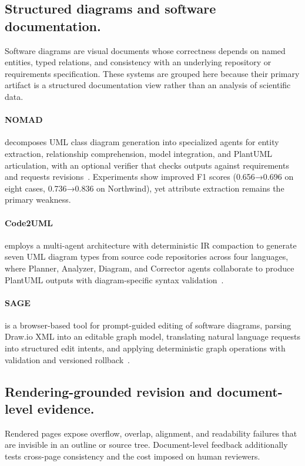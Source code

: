 \subsection{Structured diagrams and software documentation.}
Software diagrams are visual documents whose correctness depends on named entities, typed relations, and consistency with an underlying repository or requirements specification. These systems are grouped here because their primary artifact is a structured documentation view rather than an analysis of scientific data.

\paragraph{NOMAD}
 decomposes UML class diagram generation into specialized agents for entity extraction, relationship comprehension, model integration, and PlantUML articulation, with an optional verifier that checks outputs against requirements and requests revisions~\cite{avg251122409}. Experiments show improved F1 scores (0.656→0.696 on eight cases, 0.736→0.836 on Northwind), yet attribute extraction remains the primary weakness.

\paragraph{Code2UML}
 employs a multi-agent architecture with deterministic IR compaction to generate seven UML diagram types from source code repositories across four languages, where Planner, Analyzer, Diagram, and Corrector agents collaborate to produce PlantUML outputs with diagram-specific syntax validation~\cite{avg260524453}. 

\paragraph{SAGE}
 is a browser-based tool for prompt-guided editing of software diagrams, parsing Draw.io XML into an editable graph model, translating natural language requests into structured edit intents, and applying deterministic graph operations with validation and versioned rollback~\cite{avg260701102}. 

\subsection{Rendering-grounded revision and document-level evidence.}
Rendered pages expose overflow, overlap, alignment, and readability failures that are invisible in an outline or source tree. Document-level feedback additionally tests cross-page consistency and the cost imposed on human reviewers.

